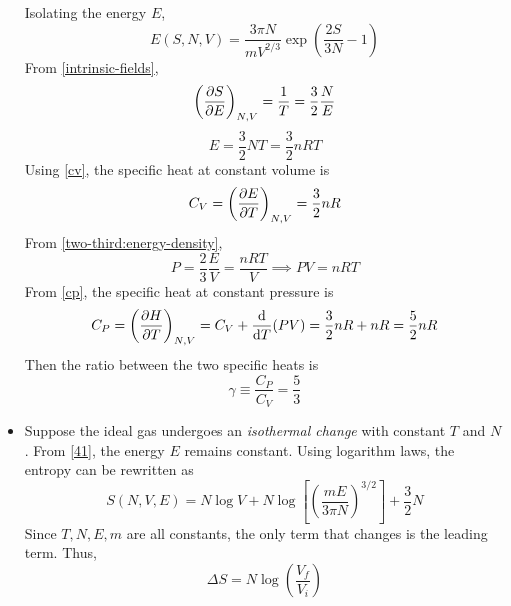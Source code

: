 \documentclass{article}
\begin{document}
\begin{itemize}
\begin{derivation}
\begin{equation}
        \end{equation}
        Isolating the energy $E$,
        \begin{equation}
            E(S,N,V)=\frac{3\pi N}{mV^{2/3}}\exp(\frac{2S}{3N}-1)
        \end{equation}
        From \eqref{intrinsic-fields}, 
        \begin{equation}
            \left(\partialderivative{S}{E}\right)_{N,V}=\frac{1}{T}=\frac{3}{2}\frac{N}{E}
        \end{equation}
        \begin{equation}
            E=\frac{3}{2}NT=\frac{3}{2}nRT\label{41}
        \end{equation}
        Using \eqref{cv}, the specific heat at constant volume is
        \begin{equation}
            C_V=\left(\partialderivative{E}{T}\right)_{N,V}=\frac{3}{2}nR
        \end{equation}
        From \eqref{two-third:energy-density}, 
        \begin{equation}
            P=\frac{2}{3}\frac{E}{V}=\frac{nRT}{V}\implies PV=nRT
        \end{equation}
        From \eqref{cp}, the specific heat at constant pressure is
        \begin{equation}
            C_P=\left(\partialderivative{H}{T}\right)_{N,V}=C_V+\frac{\dd}{\dd T}(PV)=\frac{3}{2}nR+nR=\frac{5}{2}nR
        \end{equation}
        Then the ratio between the two specific heats is
        \begin{equation}
            \gamma\equiv\frac{C_P}{C_V}=\frac{5}{3}
        \end{equation}
    \end{derivation}
    \item Suppose the ideal gas undergoes an \textit{isothermal change} with constant $T$ and $N$. From \eqref{41}, the energy $E$ remains constant. Using logarithm laws, the entropy can be rewritten as
    \begin{equation}
        S(N,V,E)=N\log V+N\log\left[\left(\frac{mE}{3\pi N}\right)^{3/2}\right]+\frac{3}{2}N
    \end{equation}
    Since $T,N,E,m$ are all constants, the only term that changes is the leading term. Thus,
    \begin{equation}
        \Delta S=N\log\left(\frac{V_f}{V_i}\right)
    \end{equation} 
\end{itemize}
\end{document}
